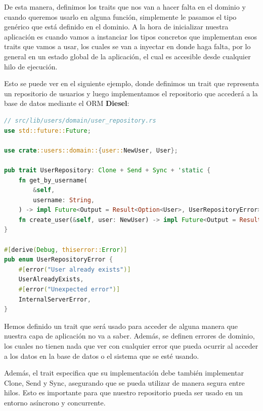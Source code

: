 De esta manera, definimos los traits que nos van a hacer falta en el dominio y cuando queremos usarlo en alguna función, simplemente le pasamos el tipo genérico que está definido en el dominio.
A la hora de inicializar nuestra aplicación es cuando vamos a instanciar los tipos concretos que implementan esos traits que vamos a usar, los cuales se van a inyectar en donde haga falta, por lo general en un estado global de la aplicación, el cual es accesible desde cualquier hilo de ejecución.

Esto se puede ver en el siguiente ejemplo, donde definimos un trait que representa un repositorio de usuarios y luego implementamos el repositorio que accederá a la base de datos mediante el ORM \textbf{Diesel}:

\begin{lstlisting}[language=Rust, caption={Trait de repositorio de usuarios}, label={lst:trait-repository}]
// src/lib/users/domain/user_repository.rs
use std::future::Future;

use crate::users::domain::{user::NewUser, User};

pub trait UserRepository: Clone + Send + Sync + 'static {
    fn get_by_username(
        &self,
        username: String,
    ) -> impl Future<Output = Result<Option<User>, UserRepositoryError>> + Send;
    fn create_user(&self, user: NewUser) -> impl Future<Output = Result<User, UserRepositoryError>> + Send;
}

#[derive(Debug, thiserror::Error)]
pub enum UserRepositoryError {
    #[error("User already exists")]
    UserAlreadyExists,
    #[error("Unexpected error")]
    InternalServerError,
}
\end{lstlisting}
Hemos definido un trait que será usado para acceder de alguna manera que nuestra capa de aplicación no va a saber. Además, se definen errores de dominio, los cuales no tienen nada que ver con cualquier error que pueda ocurrir al acceder a los datos en la base de datos o el sistema que se esté usando.

Además, el trait especifica que su implementación debe también implementar Clone, Send y Sync, asegurando que se pueda utilizar de manera segura entre hilos. Esto es importante para que nuestro repositorio pueda ser usado en un entorno asíncrono y concurrente.

